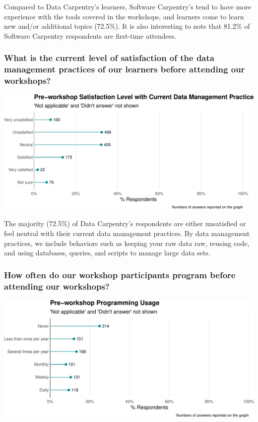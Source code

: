\documentclass[]{article}
\makeatletter
\def\maxwidth{\ifdim\Gin@nat@width>\linewidth\linewidth\else\Gin@nat@width\fi}
\makeatother
\begin{document}
Compared to Data Carpentry's learners, Software Carpentry's tend to have
more experience with the tools covered in the workshops, and learners
come to learn new and/or additional topics (72.5\%). It is also
interesting to note that 81.2\% of Software Carpentry respondents are
first-time attendees.

\subsubsection{What is the current level of satisfaction of the data
management practices of our learners before attending our
workshops?}\label{what-is-the-current-level-of-satisfaction-of-the-data-management-practices-of-our-learners-before-attending-our-workshops}

\includegraphics[width=\maxwidth]{../figures/dc-satisfaction-level-plot-1}

The majority (72.5\%) of Data Carpentry's respondents are either
unsatisfied or feel neutral with their current data management
practices. By data management practices, we include behaviors such as
keeping your raw data raw, reusing code, and using databases, queries,
and scripts to manage large data sets.

\subsubsection{How often do our workshop participants program before
attending our
workshops?}\label{how-often-do-our-workshop-participants-program-before-attending-our-workshops}

\includegraphics[width=\maxwidth]{../figures/dc-programming-level-plot-1}
\end{document}
